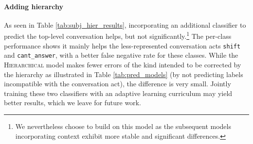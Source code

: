 \paragraph{Adding hierarchy} As seen in Table \ref{tab:subj_hier_results}, incorporating an additional classifier to predict the top-level conversation helps, but not significantly.\footnote{We nevertheless choose to build on this model as the subsequent models incorporating context exhibit more stable and significant differences.} The per-class performance shows it mainly helps the less-represented conversation acts \texttt{shift} and \texttt{cant\_answer}, with a better false negative rate for these classes. While the \textsc{Hierarchical} model makes fewer errors of the kind intended to be corrected by the hierarchy as illustrated in Table \ref{tab:pred_models} (by not predicting labels incompatible with the conversation act), the difference is very small. Jointly training these two classifiers with an adaptive learning curriculum may yield better results, which we leave for future work.

\begin{table}[]
\centering
{}
\vspace{-.3em}
\caption{Overall and class-level macro-F1 on the test sets for models that incorporate context from the question and from the annotator. $^\ast$ indicates stat. sig. better vs. \textsc{Hierarchical}.}
\label{tab:subj_context_results}
\end{table}



